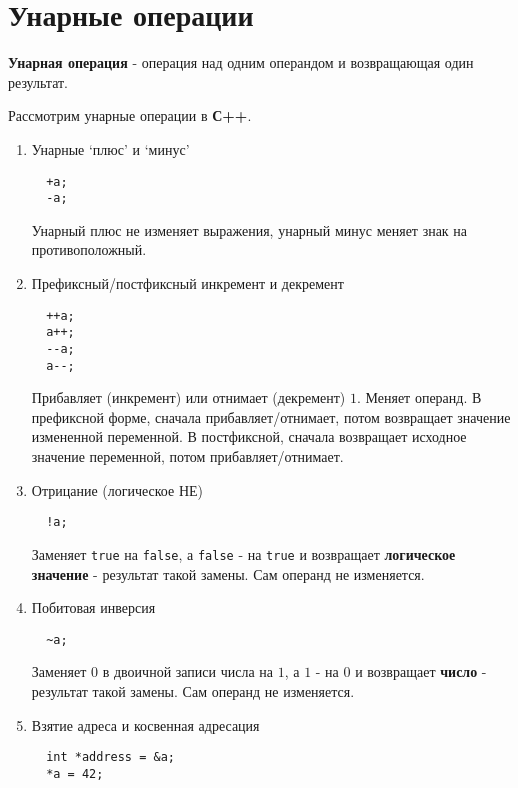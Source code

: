 \section{Унарные
операции}\label{ux443ux43dux430ux440ux43dux44bux435-ux43eux43fux435ux440ux430ux446ux438ux438}

\textbf{Унарная операция} - операция над одним операндом и возвращающая
один результат.

Рассмотрим унарные операции в \textbf{С++}.

\begin{enumerate}
\def\labelenumi{\arabic{enumi})}
\item
  Унарные `плюс' и `минус'

\begin{Verbatim}
  +a;
  -a;
\end{Verbatim}

  Унарный плюс не изменяет выражения, унарный минус меняет знак на
  противоположный.
\item
  Префиксный/постфиксный инкремент и декремент

\begin{Verbatim}
  ++a;
  a++;
  --a;
  a--;
\end{Verbatim}

  Прибавляет (инкремент) или отнимает (декремент) \(1\). Меняет операнд.
  В префиксной форме, сначала прибавляет/отнимает, потом возвращает
  значение измененной переменной. В постфиксной, сначала возвращает
  исходное значение переменной, потом прибавляет/отнимает.
\item
  Отрицание (логическое НЕ)

\begin{Verbatim}
  !a;
\end{Verbatim}

  Заменяет \texttt{true} на \texttt{false}, а \texttt{false} - на
  \texttt{true} и возвращает \textbf{логическое значение} - результат
  такой замены. Сам операнд не изменяется.
\item
  Побитовая инверсия

\begin{Verbatim}
  ~a;
\end{Verbatim}

  Заменяет \(0\) в двоичной записи числа на \(1\), а \(1\) - на \(0\) и
  возвращает \textbf{число} - результат такой замены. Сам операнд не
  изменяется.
\item
  Взятие адреса и косвенная адресация

\begin{Verbatim}
  int *address = &a;
  *a = 42;
\end{Verbatim}


\end{enumerate}
